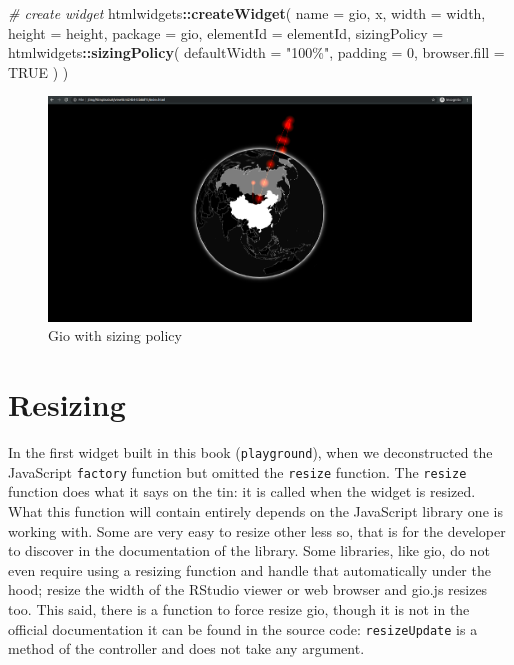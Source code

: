 \documentclass[
]{krantz}
\makeatletter
\newenvironment{Shaded}{\begin{snugshade}}{\end{snugshade}}
\newcommand{\CommentTok}[1]{\textcolor[rgb]{0.37,0.37,0.37}{\textit{#1}}}
\newcommand{\DataTypeTok}[1]{\textcolor[rgb]{0.27,0.27,0.27}{#1}}
\newcommand{\DecValTok}[1]{\textcolor[rgb]{0.06,0.06,0.06}{#1}}
\newcommand{\KeywordTok}[1]{\textcolor[rgb]{0.27,0.27,0.27}{\textbf{#1}}}
\newcommand{\NormalTok}[1]{#1}
\newcommand{\OperatorTok}[1]{\textcolor[rgb]{0.43,0.43,0.43}{\textbf{#1}}}
\newcommand{\OtherTok}[1]{\textcolor[rgb]{0.37,0.37,0.37}{#1}}
\newcommand{\StringTok}[1]{\textcolor[rgb]{0.5,0.5,0.5}{#1}}
\newenvironment{kframe}{%
\medskip{}
\setlength{\fboxsep}{.8em}
 \def\at@end@of@kframe{}%
 \ifinner\ifhmode%
  \def\at@end@of@kframe{\end{minipage}}%
  \begin{minipage}{\columnwidth}%
 \fi\fi%
 \def\FrameCommand##1{\hskip\@totalleftmargin \hskip-\fboxsep
 \colorbox{shadecolor}{##1}\hskip-\fboxsep
     \hskip-\linewidth \hskip-\@totalleftmargin \hskip\columnwidth}%
 \MakeFramed {\advance\hsize-\width
   \@totalleftmargin\z@ \linewidth\hsize
   \@setminipage}}%
 {\par\unskip\endMakeFramed%
 \at@end@of@kframe}
\renewenvironment{Shaded}{\begin{kframe}}{\end{kframe}}
\makeatother
\begin{document}
\begin{Shaded}
\begin{Highlighting}[]
\CommentTok{\# create widget}
\NormalTok{htmlwidgets}\OperatorTok{::}\KeywordTok{createWidget}\NormalTok{(}
  \DataTypeTok{name =} \StringTok{\textquotesingle{}gio\textquotesingle{}}\NormalTok{,}
\NormalTok{  x,}
  \DataTypeTok{width =}\NormalTok{ width,}
  \DataTypeTok{height =}\NormalTok{ height,}
  \DataTypeTok{package =} \StringTok{\textquotesingle{}gio\textquotesingle{}}\NormalTok{,}
  \DataTypeTok{elementId =}\NormalTok{ elementId,}
  \DataTypeTok{sizingPolicy =}\NormalTok{ htmlwidgets}\OperatorTok{::}\KeywordTok{sizingPolicy}\NormalTok{(}
    \DataTypeTok{defaultWidth =} \StringTok{"100\%"}\NormalTok{,}
    \DataTypeTok{padding =} \DecValTok{0}\NormalTok{,}
    \DataTypeTok{browser.fill =} \OtherTok{TRUE}
\NormalTok{  )}
\NormalTok{)}
\end{Highlighting}
\end{Shaded}

\begin{figure}
\centering
\includegraphics{images/gio-fit.png}
\caption{Gio with sizing policy}
\end{figure}

\hypertarget{resizing}{%
\section{Resizing}\label{resizing}}

In the first widget built in this book (\texttt{playground}), when we deconstructed the JavaScript \texttt{factory} function but omitted the \texttt{resize} function. The \texttt{resize} function does what it says on the tin: it is called when the widget is resized. What this function will contain entirely depends on the JavaScript library one is working with. Some are very easy to resize other less so, that is for the developer to discover in the documentation of the library. Some libraries, like gio, do not even require using a resizing function and handle that automatically under the hood; resize the width of the RStudio viewer or web browser and gio.js resizes too. This said, there is a function to force resize gio, though it is not in the official documentation it can be found in the source code: \texttt{resizeUpdate} is a method of the controller and does not take any argument.
\end{document}
